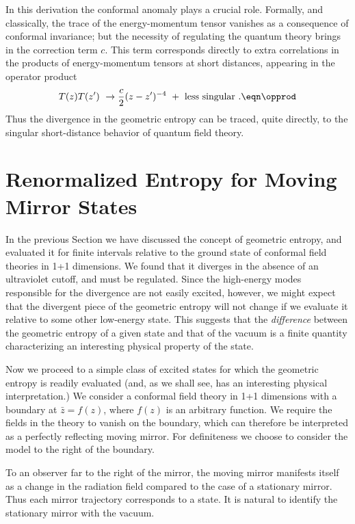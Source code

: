 In this derivation the conformal anomaly plays a crucial role.
Formally, and classically,
the trace of the energy-momentum tensor vanishes as a consequence
of conformal invariance; but the necessity of regulating the
quantum theory brings in the correction term $c$.
This term corresponds directly
to extra correlations in the products of energy-momentum tensors at
short distances, appearing in the operator product
$$
T(z)T(z^{\prime} ) ~\rightarrow {c\over  2}  (z - z^{\prime})^{-4}
{}~+~ {\rm less\ singular}~.
\eqn\opprod
$$
Thus the divergence in the geometric
entropy can be traced, quite directly, to the
singular short-distance behavior of quantum field theory.

\chapter{Renormalized Entropy for Moving Mirror States}

In the previous Section we have discussed the concept of geometric
entropy, and evaluated it for finite
intervals relative to the ground
state of conformal field theories in 1+1 dimensions.
We found that it diverges in the absence of an ultraviolet cutoff, and
must be regulated.  Since the high-energy modes responsible for the
divergence are not easily excited, however, we might expect that
the divergent piece of the geometric entropy will not change if we evaluate
it relative to some other low-energy state.  This suggests that the
{\it difference\/} between the geometric entropy of a given state and
that of the vacuum is a finite quantity characterizing an interesting
physical property of the state.


Now we proceed to a simple class of excited states for
which the geometric entropy
is readily evaluated (and, as we shall see, has an interesting
physical interpretation.)
We consider
a conformal field theory in 1+1 dimensions
with a boundary at ${\bar z}=f(z)$, where $f(z)$ is
an arbitrary function.  We require
the fields in the theory to
vanish on the boundary, which can therefore be interpreted
as a
perfectly reflecting moving mirror.
For definiteness we choose to consider the model
to the right of the boundary.

To an observer far to the right of the mirror,
the moving mirror manifests itself as a change in the radiation
field compared to the case of a stationary mirror.  Thus each mirror
trajectory corresponds to a state. It is natural to identify
the stationary mirror with the vacuum.

